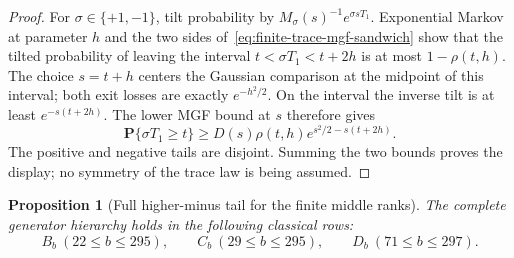 \documentclass[11pt,reqno]{amsart}
\theoremstyle{plain}
\newtheorem{proposition}[theorem]{Proposition}
\theoremstyle{definition}
\begin{document}
\begin{proof}
For $\sigma\in\{+1,-1\}$, tilt probability by
$M_\sigma(s)^{-1}e^{\sigma sT_1}$.  Exponential Markov at parameter $h$
and the two sides of~\eqref{eq:finite-trace-mgf-sandwich} show that the
tilted probability of leaving the interval
$t<\sigma T_1<t+2h$ is at most $1-\rho(t,h)$.  The choice
$s=t+h$ centers the Gaussian comparison at the midpoint of this interval;
both exit losses are exactly $e^{-h^2/2}$.  On the interval the inverse tilt
is at least $e^{-s(t+2h)}$.  The lower MGF bound at $s$ therefore
gives
\[
 \mathbf P\{\sigma T_1\geq t\}
 \geq D(s)\rho(t,h)e^{s^2/2-s(t+2h)}.
\]
The positive and negative tails are disjoint.  Summing the two bounds proves
the display; no symmetry of the trace law is being assumed.
\end{proof}

\begin{proposition}[Full higher-minus tail for the finite middle ranks]
\label{prop:bcd-middle-rank-full-tail}
The complete generator hierarchy holds in the following classical rows:
\[
 B_b\ (22\leq b\leq295),\qquad
 C_b\ (29\leq b\leq295),\qquad
 D_b\ (71\leq b\leq297).
\]
\end{proposition}
\end{document}
